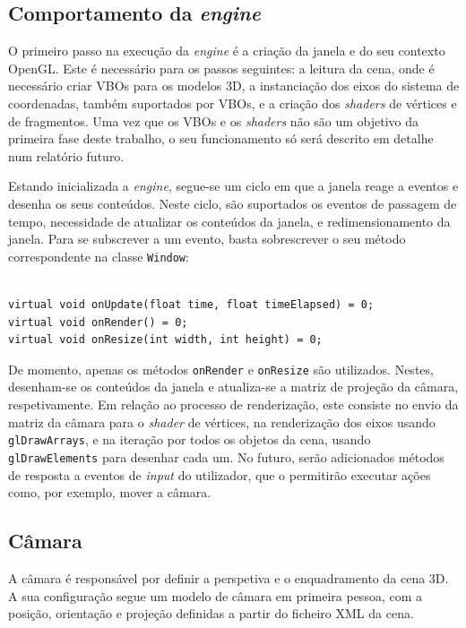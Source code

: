 \documentclass[12pt, a4paper]{article}
\begin{document}
\subsection{Comportamento da \emph{engine}}

O primeiro passo na execução da \emph{engine} é a criação da janela e do seu contexto OpenGL. Este é
necessário para os passos seguintes: a leitura da cena, onde é necessário criar VBOs para os
modelos 3D, a instanciação dos eixos do sistema de coordenadas, também suportados por VBOs, e a
criação dos \emph{shaders} de vértices e de fragmentos. Uma vez que os VBOs e os \emph{shaders} não
são um objetivo da primeira fase deste trabalho, o seu funcionamento só será descrito em detalhe num
relatório futuro.

Estando inicializada a \emph{engine}, segue-se um ciclo em que a janela reage a eventos e desenha os
seus conteúdos. Neste ciclo, são suportados os eventos de passagem de tempo, necessidade de
atualizar os conteúdos da janela, e redimensionamento da janela. Para se subscrever a um evento,
basta sobrescrever o seu método correspondente na classe \texttt{Window}:

\begin{lstlisting}

virtual void onUpdate(float time, float timeElapsed) = 0;
virtual void onRender() = 0;
virtual void onResize(int width, int height) = 0;
\end{lstlisting}

De momento, apenas os métodos \texttt{onRender} e \texttt{onResize} são utilizados. Nestes,
desenham-se os conteúdos da janela e atualiza-se a matriz de projeção da câmara, respetivamente. Em
relação ao processo de renderização, este consiste no envio da matriz da câmara para o \emph{shader}
de vértices, na renderização dos eixos usando \texttt{glDrawArrays}, e na iteração por todos os
objetos da cena, usando \texttt{glDrawElements} para desenhar cada um. No futuro, serão adicionados
métodos de resposta a eventos de \emph{input} do utilizador, que o permitirão executar ações como,
por exemplo, mover a câmara.

\subsection{Câmara}

A câmara é responsável por definir a perspetiva e o enquadramento da cena 3D. A sua configuração
segue um modelo de câmara em primeira pessoa, com a posição, orientação e projeção definidas a
partir do ficheiro XML da cena.
\end{document}
